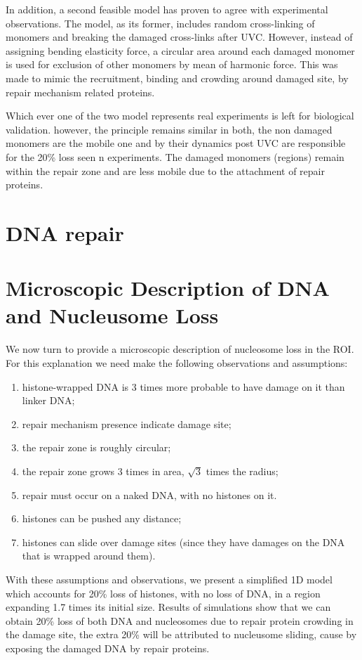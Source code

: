 \documentclass[12pt]{report}
\begin{document}
     In addition, a second feasible model has proven to agree with experimental observations. The model, as its former, includes random cross-linking of monomers and breaking the damaged cross-links after UVC. However, instead of assigning bending elasticity force, a circular area around each damaged monomer is used for exclusion of other monomers by mean of harmonic force. This was made to mimic the recruitment, binding and crowding around damaged site, by repair mechanism related proteins.
     
          
     Which ever one of the two model represents real experiments is left for biological validation. however, the principle remains similar in both, the non damaged monomers are the mobile one and by their dynamics post UVC are responsible for the 20\% loss seen n experiments. The damaged monomers (regions) remain within the repair zone and are less mobile due to the attachment of repair proteins. 
     
\section{DNA repair}
     
\section{Microscopic Description of DNA and Nucleusome Loss}
  We now turn to provide a microscopic description of nucleosome loss in the ROI. For this explanation we need make the following observations and assumptions:
  \begin{enumerate}
  	\item histone-wrapped DNA is 3 times more probable to have damage on it than linker DNA;
  	\item repair mechanism presence indicate damage site;
  	\item the repair zone is roughly circular;
  	\item the repair zone grows 3 times in area, $\sqrt{3}$ times the radius;
  	\item repair must occur on a naked DNA, with no histones on it. 
  	\item histones can be pushed any distance;
  	\item histones can slide over damage sites (since they have damages on the DNA that is wrapped around them).
  \end{enumerate}
     With these assumptions and observations, we present a simplified 1D model which accounts for 20\% loss of histones, with no loss of DNA, in a region expanding 1.7 times its initial size. Results of simulations show that we can obtain 20\% loss of both DNA and nucleosomes due to repair protein crowding in the damage site, the extra 20\% will be attributed to nucleusome sliding, cause by exposing the damaged DNA by repair proteins.
     
\end{document}
